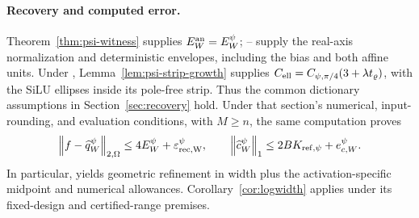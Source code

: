 \paragraph{Recovery and computed error.}
Theorem~\ref{thm:psi-witness} supplies $E_W^{\rm an}=E_W^\psi$;
-- supply
the real-axis normalization and deterministic envelopes, including the bias
and both affine units. Under ,
Lemma~\ref{lem:psi-strip-growth} supplies
$C_{\rm ell}=C_{\psi,\pi/4}(3+\lambda t_\varrho)$, with the SiLU ellipses
inside its pole-free strip. Thus the common dictionary assumptions in
Section~\ref{sec:recovery} hold. Under that section's numerical,
input-rounding, and evaluation conditions, with $M\ge n$, the same
computation proves
\begin{equation}
 \left\lVert f-\widehat q_W^\psi\right\rVert_{2,\Omega}
 \le4E_W^\psi+\varepsilon_{\rm rec,W}^\psi,
 \qquad
 \left\lVert \widehat c_W^\psi\right\rVert_1\le2BK_{{\rm ref},\psi}+e_{c,W}^\psi.
 \label{eq:psi-computed}
\end{equation}
In particular,  yields geometric refinement in width plus
the activation-specific midpoint and numerical allowances.
Corollary~\ref{cor:logwidth} applies under its fixed-design and certified-range
premises.

